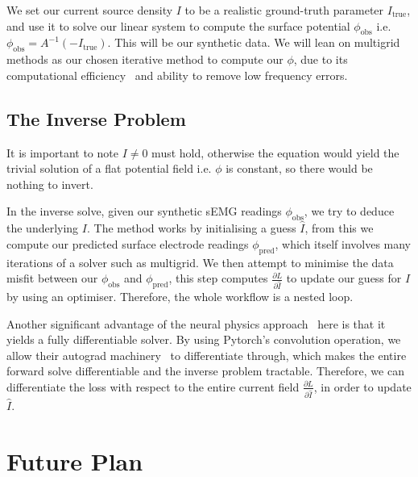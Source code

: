 \documentclass[project-plan]{report-template}
\begin{document}
We set our current source density $I$ to be a realistic ground-truth parameter $I_{\text{true}}$, and use it to solve our linear system to compute the surface potential $\phi_{\text{obs}}$ i.e. $\phi_{\text{obs}} = A^{-1} (-I_{\text{true}})$. This will be our synthetic data. We will lean on multigrid methods as our chosen iterative method to compute our $\phi$, due to its computational efficiency~\cite{chen2026} and ability to remove low frequency errors.

\subsection{The Inverse Problem}
It is important to note $I \neq 0$ must hold, otherwise the equation would yield the trivial solution of a flat potential field i.e. $\phi$ is constant, so there would be nothing to invert.

In the inverse solve, given our synthetic sEMG readings $\phi_{\text{obs}}$, we try to deduce the underlying $I$. The method works by initialising a guess $\hat{I}$, from this we compute our predicted surface electrode readings $\phi_{\text{pred}}$, which itself involves many iterations of a solver such as multigrid. We then attempt to minimise the data misfit between our $\phi_{\text{obs}}$ and $\phi_{\text{pred}}$, this step computes $\frac{\partial L}{\partial \hat{I}}
$ to update our guess for $I$ by using an optimiser. Therefore, the whole workflow is a nested loop.

Another significant advantage of the neural physics approach~\cite{chen2026} here is that it yields a fully differentiable solver. By using Pytorch's convolution operation, we allow their autograd machinery~\cite{paszke2019} to differentiate through, which makes the entire forward solve differentiable and the inverse problem tractable. Therefore, we can differentiate the loss with respect to the entire current field $\frac{\partial L}{\partial \hat{I}}$, in order to update $\hat{I}$.

\newpage

\section{Future Plan}
\end{document}
